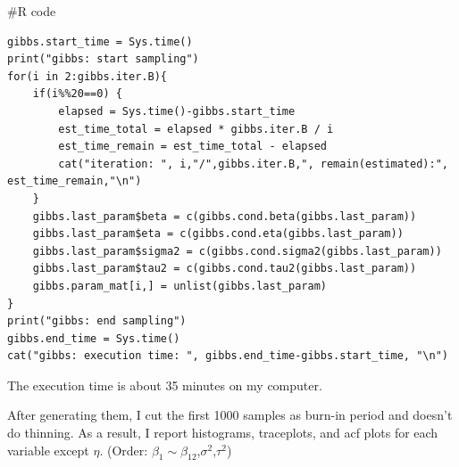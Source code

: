 \documentclass{article}
\newenvironment{Rcode}%
{%
    \begin{mdframed}
    \#R code
    \begin{small}
}
{%
    \end{small}
    \end{mdframed}
}
\begin{document}
\begin{Rcode}
\begin{verbatim}
gibbs.start_time = Sys.time()
print("gibbs: start sampling")
for(i in 2:gibbs.iter.B){
    if(i%%20==0) {
        elapsed = Sys.time()-gibbs.start_time
        est_time_total = elapsed * gibbs.iter.B / i
        est_time_remain = est_time_total - elapsed
        cat("iteration: ", i,"/",gibbs.iter.B,", remain(estimated):", est_time_remain,"\n")
    }
    gibbs.last_param$beta = c(gibbs.cond.beta(gibbs.last_param))
    gibbs.last_param$eta = c(gibbs.cond.eta(gibbs.last_param))
    gibbs.last_param$sigma2 = c(gibbs.cond.sigma2(gibbs.last_param))
    gibbs.last_param$tau2 = c(gibbs.cond.tau2(gibbs.last_param))
    gibbs.param_mat[i,] = unlist(gibbs.last_param)
}
print("gibbs: end sampling")
gibbs.end_time = Sys.time()
cat("gibbs: execution time: ", gibbs.end_time-gibbs.start_time, "\n")
    \end{verbatim}
\end{Rcode}

The execution time is about 35 minutes on my computer.

After generating them, I cut the first 1000 samples as burn-in period and doesn't do thinning.
As a result, I report histograms, traceplots, and acf plots for each variable except $\eta$.
(Order: $\beta_1 \sim \beta_{12}$,$\sigma^2$,$\tau^2$)
\end{document}
